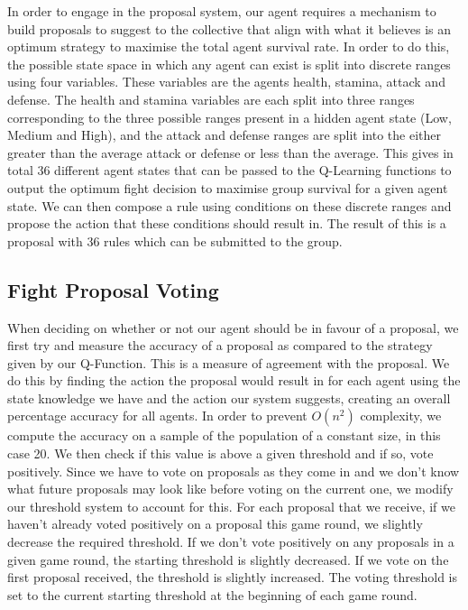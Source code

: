 In order to engage in the proposal system, our agent requires a mechanism to build proposals to suggest to the collective that align with what it believes is an optimum strategy to maximise the total agent survival rate. In order to do this, the possible state space in which any agent can exist is split into discrete ranges using four variables. These variables are the agents health, stamina, attack and defense. The health and stamina variables are each split into three ranges corresponding to the three possible ranges present in a hidden agent state (Low, Medium and High), and the attack and defense ranges are split into the either greater than the average attack or defense or less than the average. This gives in total 36 different agent states that can be passed to the Q-Learning functions to output the optimum fight decision to maximise group survival for a given agent state. 
We can then compose a rule using conditions on these discrete ranges and propose the action that these conditions should result in. The result of this is a proposal with 36 rules which can be submitted to the group.

\subsection{Fight Proposal Voting}

When deciding on whether or not our agent should be in favour of a proposal, we first try and measure the accuracy of a proposal as compared to the strategy given by our Q-Function. This is a measure of agreement with the proposal. We do this by finding the action the proposal would result in for each agent using the state knowledge we have and the action our system suggests, creating an overall percentage accuracy for all agents. In order to prevent $O(n^2)$ complexity, we compute the accuracy on a sample of the population of a constant size, in this case 20.  We then check if this value is above a given threshold and if so, vote positively. Since we have to vote on proposals as they come in and we don't know what future proposals may look like before voting on the current one, we modify our threshold system to account for this. For each proposal that we receive, if we haven't already voted positively on a proposal this game round, we slightly decrease the required threshold. If we don't vote positively on any proposals in a given game round, the starting threshold is slightly decreased. If we vote on the first proposal received, the threshold is slightly increased. The voting threshold is set to the current starting threshold at the beginning of each game round.

